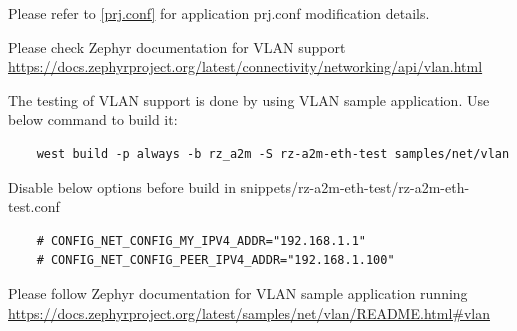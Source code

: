 \documentclass[11pt,a4paper,oneside]{article}
\begin{document}
Please refer to \ref{prj.conf} for application prj.conf modification details.

Please check Zephyr documentation for VLAN support
\url{https://docs.zephyrproject.org/latest/connectivity/networking/api/vlan.html}

The testing of VLAN support is done by using VLAN sample application. Use below command to build it:
\begin{lstlisting}
	west build -p always -b rz_a2m -S rz-a2m-eth-test samples/net/vlan
\end{lstlisting}

Disable below options before build in snippets/rz-a2m-eth-test/rz-a2m-eth-test.conf
\begin{lstlisting}
	# CONFIG_NET_CONFIG_MY_IPV4_ADDR="192.168.1.1"
	# CONFIG_NET_CONFIG_PEER_IPV4_ADDR="192.168.1.100"

\end{lstlisting}

Please follow Zephyr documentation for VLAN sample application running
\url{https://docs.zephyrproject.org/latest/samples/net/vlan/README.html#vlan}
\end{document}
